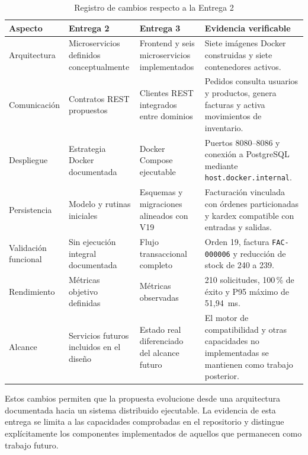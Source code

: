 \documentclass[12pt]{article}
\begin{document}
    \begin{table}[H]
        \centering
        \caption{Registro de cambios respecto a la Entrega 2}
        \label{tab:registro_cambios}
        \small
        \begin{tabularx}{\textwidth}{p{2.8cm} p{2.8cm} p{3.2cm} X}
\toprule
\textbf{Aspecto} & \textbf{Entrega 2} & \textbf{Entrega 3} & \textbf{Evidencia verificable} \\
\midrule

Arquitectura &
Microservicios definidos conceptualmente &
Frontend y seis microservicios implementados &
Siete imágenes Docker construidas y siete contenedores activos. \\
\midrule

Comunicación &
Contratos REST propuestos &
Clientes REST integrados entre dominios &
Pedidos consulta usuarios y productos, genera facturas y activa movimientos de inventario. \\
\midrule

Despliegue &
Estrategia Docker documentada &
Docker Compose ejecutable &
Puertos 8080--8086 y conexión a PostgreSQL mediante \texttt{host.docker.internal}. \\
\midrule

Persistencia &
Modelo y rutinas iniciales &
Esquemas y migraciones alineados con V19 &
Facturación vinculada con órdenes particionadas y kardex compatible con entradas y salidas. \\
\midrule

Validación funcional &
Sin ejecución integral documentada &
Flujo transaccional completo &
Orden 19, factura \texttt{FAC-000006} y reducción de stock de 240 a 239. \\
\midrule

Rendimiento &
Métricas objetivo definidas &
Métricas observadas &
210 solicitudes, 100\,\% de éxito y P95 máximo de 51,94~ms. \\
\midrule

Alcance &
Servicios futuros incluidos en el diseño &
Estado real diferenciado del alcance futuro &
El motor de compatibilidad y otras capacidades no implementadas se mantienen como trabajo posterior. \\

\bottomrule
        \end{tabularx}
    \end{table}

    Estos cambios permiten que la propuesta evolucione desde una arquitectura documentada hacia un sistema distribuido ejecutable. La evidencia de esta entrega se limita a las capacidades comprobadas en el repositorio y distingue explícitamente los componentes implementados de aquellos que permanecen como trabajo futuro.
\end{document}
